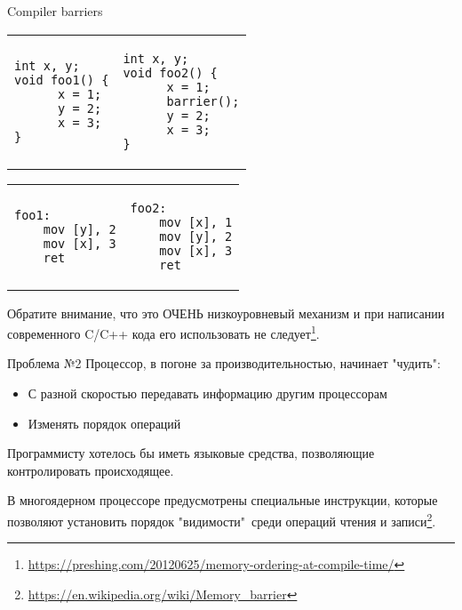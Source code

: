 \begin{frame}[t, fragile]{Compiler barriers}

\vspace{-0.5cm}
\begin{tabular}{p{} p{}}
\begin{verbatim}
int x, y;
void foo1() {
      x = 1;
      y = 2;
      x = 3;
}
\end{verbatim}

& 

\begin{verbatim}
int x, y;
void foo2() {
      x = 1;
      barrier();
      y = 2;
      x = 3;
}
\end{verbatim}
\end{tabular}

\pause
\vspace{-0.5cm}

\begin{tabular}{p{} p{}}

\begin{verbatim}
foo1:
    mov [y], 2
    mov [x], 3
    ret
\end{verbatim}

& 

\begin{verbatim}
foo2:
    mov [x], 1
    mov [y], 2
    mov [x], 3
    ret
\end{verbatim}
\end{tabular}

\pause
Обратите внимание, что это ОЧЕНЬ низкоуровневый механизм и при написании современного C/C++ кода его использовать не следует\footnote<3->{\tiny\url{https://preshing.com/20120625/memory-ordering-at-compile-time/}}.

\end{frame}


\begin{frame}{Проблема №2}
Процессор, в погоне за производительностью, начинает "чудить":
\begin{itemize}
	\pause
	\item С разной скоростью передавать информацию другим процессорам 
	\item Изменять порядок операций
\end{itemize}

\pause
Программисту хотелось бы иметь языковые средства, позволяющие контролировать происходящее.

\pause
В многоядерном процессоре предусмотрены специальные инструкции, которые позволяют установить порядок "видимости"\ среди операций чтения и записи\footnote<4->{\tiny\url{https://en.wikipedia.org/wiki/Memory_barrier}}.

\end{frame}

